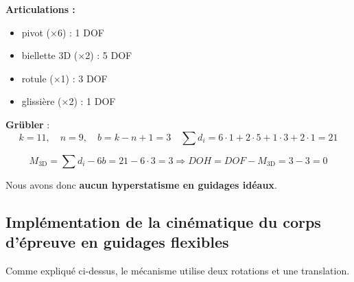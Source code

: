 \documentclass[a4paper, 11pt]{article} %
\begin{document}
\textbf{Articulations :}

\begin{itemize}
    \item pivot (×6) : 1 DOF
    \item biellette 3D (×2) : 5 DOF
    \item rotule (×1) : 3 DOF
    \item glissière (×2) : 1 DOF
\end{itemize}

\textbf{Grübler }:
 $$ k = 11, \quad n = 9, \quad b = k - n + 1 = 3 \quad  \sum d_i =  6 \cdot 1 + 2 \cdot 5 + 1 \cdot 3  + 2 \cdot 1= 21 $$



 \[M_\text{3D} = \sum d_i - 6b = 21 - 6 \cdot 3 = 3\Rightarrow DOH = DOF - M_\text{3D} = 3 - 3 = 0\]

 Nous avons donc \textbf{aucun hyperstatisme en guidages idéaux}.
\subsection{Implémentation de la cinématique du corps d’épreuve en guidages flexibles}
    Comme expliqué ci-dessus, le mécanisme utilise deux rotations et une translation.
\end{document}
